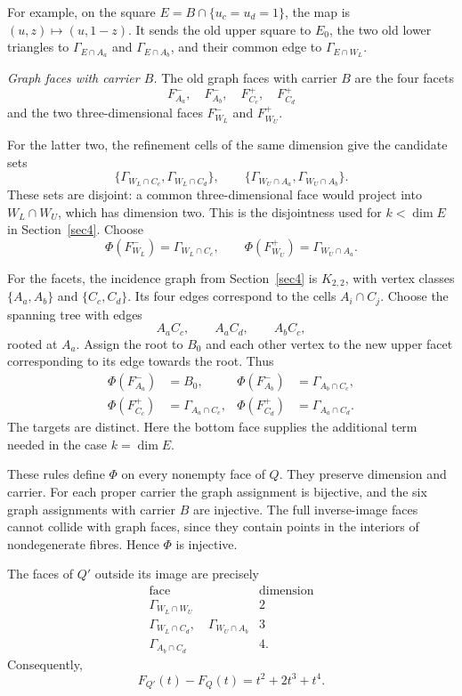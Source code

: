\documentclass[a4paper,12pt]{amsart}
\theoremstyle{definition}
\theoremstyle{remark}
\begin{document}
For example, on the square $E=B\cap\{u_c=u_d=1\}$, the map is $(u,z)\mapsto(u,1-z)$.
It sends the old upper square to $E_0$, the two old lower triangles to $\Gamma_{E\cap A_a}$ and $\Gamma_{E\cap A_b}$, and their common edge to $\Gamma_{E\cap W_L}$.

\smallskip
\noindent\emph{Graph faces with carrier $B$.}
The old graph faces with carrier $B$ are the four facets
\[
 F^-_{A_a},\quad F^-_{A_b},\quad F^+_{C_c},\quad F^+_{C_d}
\]
and the two three-dimensional faces $F^-_{W_L}$ and $F^+_{W_U}$.

For the latter two, the refinement cells of the same dimension give the candidate sets
\[
 \{\Gamma_{W_L\cap C_c},\Gamma_{W_L\cap C_d}\},\qquad \{\Gamma_{W_U\cap A_a},\Gamma_{W_U\cap A_b}\}.
\]
These sets are disjoint: a common three-dimensional face would project into $W_L\cap W_U$, which has dimension two.
This is the disjointness used for $k<\dim E$ in Section~\ref{sec4}.
Choose
\[
 \Phi(F^-_{W_L})=\Gamma_{W_L\cap C_c},\qquad \Phi(F^+_{W_U})=\Gamma_{W_U\cap A_a}.
\]

For the facets, the incidence graph from Section~\ref{sec4} is $K_{2,2}$, with vertex classes $\{A_a,A_b\}$ and $\{C_c,C_d\}$.
Its four edges correspond to the cells $A_i\cap C_j$.
Choose the spanning tree with edges
\[
 A_aC_c,\qquad A_aC_d,\qquad A_bC_c,
\]
rooted at $A_a$.
Assign the root to $B_0$ and each other vertex to the new upper facet corresponding to its edge towards the root.
Thus
\[
 \begin{aligned}
 \Phi(F^-_{A_a})&=B_0,& \Phi(F^-_{A_b})&=\Gamma_{A_b\cap C_c},\\
 \Phi(F^+_{C_c})&=\Gamma_{A_a\cap C_c},& \Phi(F^+_{C_d})&=\Gamma_{A_a\cap C_d}.
 \end{aligned}
\]
The targets are distinct.
Here the bottom face supplies the additional term needed in the case $k=\dim E$.

These rules define $\Phi$ on every nonempty face of $Q$.
They preserve dimension and carrier.
For each proper carrier the graph assignment is bijective, and the six graph assignments with carrier $B$ are injective.
The full inverse-image faces cannot collide with graph faces, since they contain points in the interiors of nondegenerate fibres.
Hence $\Phi$ is injective.

The faces of $Q'$ outside its image are precisely
\[
 \begin{array}{c|c}
  \text{face}&\text{dimension}\\ \hline
  \Gamma_{W_L\cap W_U}&2\\
  \Gamma_{W_L\cap C_d},\quad\Gamma_{W_U\cap A_b}&3\\
  \Gamma_{A_b\cap C_d}&4.
 \end{array}
\]
Consequently,
\[
 F_{Q'}(t)-F_Q(t)=t^2+2t^3+t^4.
\]
\end{document}
